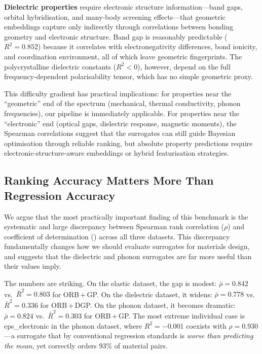 \textbf{Dielectric properties} require electronic structure information---band gaps, orbital hybridisation, and many-body screening effects---that geometric embeddings capture only indirectly through correlations between bonding geometry and electronic structure.
Band gap is reasonably predictable ($R^2 = 0.852$) because it correlates with electronegativity differences, bond ionicity, and coordination environment, all of which leave geometric fingerprints.
The polycrystalline dielectric constants ($R^2 < 0$), however, depend on the full frequency-dependent polarisability tensor, which has no simple geometric proxy.

This difficulty gradient has practical implications: for properties near the ``geometric'' end of the spectrum (mechanical, thermal conductivity, phonon frequencies), our pipeline is immediately applicable.
For properties near the ``electronic'' end (optical gaps, dielectric response, magnetic moments), the Spearman correlations suggest that the surrogates can still guide Bayesian optimisation through reliable ranking, but absolute property predictions require electronic-structure-aware embeddings or hybrid featurisation strategies.

\FloatBarrier
\subsection{Ranking Accuracy Matters More Than Regression Accuracy}
\label{sec:spearman_r2}

We argue that the most practically important finding of this benchmark is the systematic and large discrepancy between Spearman rank correlation ($\rho$) and coefficient of determination (\Rtwo{}) across all three datasets.
This discrepancy fundamentally changes how we should evaluate surrogates for materials design, and suggests that the dielectric and phonon surrogates are far more useful than their \Rtwo{} values imply.

The numbers are striking.
On the elastic dataset, the gap is modest: $\bar{\rho} = 0.842$ vs.\ $\bar{R}^2 = 0.803$ for ORB\,+\,GP.
On the dielectric dataset, it widens: $\bar{\rho} = 0.778$ vs.\ $\bar{R}^2 = 0.336$ for ORB\,+\,DGP.
On the phonon dataset, it becomes dramatic: $\bar{\rho} = 0.824$ vs.\ $\bar{R}^2 = 0.303$ for ORB\,+\,GP.
The most extreme individual case is eps\_electronic in the phonon dataset, where $R^2 = -0.001$ coexists with $\rho = 0.930$---a surrogate that by conventional regression standards is \emph{worse than predicting the mean}, yet correctly orders 93\% of material pairs.

